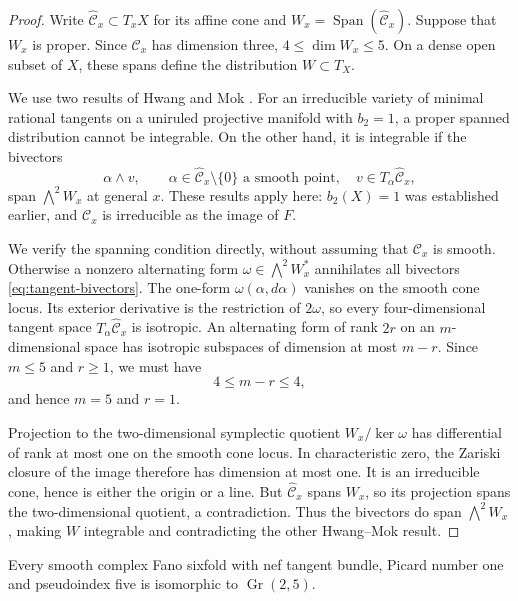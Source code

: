 \begin{proof}
Write $\widehat{\mathcal C}_x\subset T_xX$ for its affine cone and
$W_x=\operatorname{Span}(\widehat{\mathcal C}_x)$.  Suppose that $W_x$
is proper.  Since $\mathcal C_x$ has dimension three,
$4\leq\dim W_x\leq5$.  On a dense open subset of $X$, these spans
define the distribution $W\subset T_X$.

We use two results of Hwang and Mok
\cite[Propositions~1.2.1 and~1.2.2]{HwangMok1999}.  For an irreducible
variety of minimal rational tangents on a uniruled projective manifold
with $b_2=1$, a proper spanned distribution cannot be integrable.  On
the other hand, it is integrable if the bivectors
\begin{equation}\label{eq:tangent-bivectors}
 \alpha\wedge v,\qquad
 \alpha\in\widehat{\mathcal C}_x\setminus\{0\}
 \text{ a smooth point},\quad
 v\in T_\alpha\widehat{\mathcal C}_x,
\end{equation}
span $\bigwedge^2W_x$ at general $x$.  These results apply here:
$b_2(X)=1$ was established earlier, and $\mathcal C_x$ is irreducible
as the image of $F$.

We verify the spanning condition directly, without assuming that
$\mathcal C_x$ is smooth.  Otherwise a nonzero alternating form
$\omega\in\bigwedge^2W_x^*$ annihilates all bivectors
\eqref{eq:tangent-bivectors}.  The one-form $\omega(\alpha,d\alpha)$
vanishes on the smooth cone locus.  Its exterior derivative is the
restriction of $2\omega$, so every four-dimensional tangent space
$T_\alpha\widehat{\mathcal C}_x$ is isotropic.  An alternating form
of rank $2r$ on an $m$-dimensional space has isotropic subspaces of
dimension at most $m-r$.  Since $m\leq5$ and $r\geq1$, we must have
\[
 4\leq m-r\leq4,
\]
and hence $m=5$ and $r=1$.

Projection to the two-dimensional symplectic quotient
$W_x/\ker\omega$ has differential of rank at most one on the smooth
cone locus.  In characteristic zero, the Zariski closure of the image therefore
has dimension at most one.  It is an irreducible cone, hence is either
the origin or a line.  But $\widehat{\mathcal C}_x$ spans $W_x$, so
its projection spans the two-dimensional quotient, a contradiction.
Thus the bivectors do span $\bigwedge^2W_x$, making $W$ integrable
and contradicting the other Hwang--Mok result.
\end{proof}

\begin{proposition}\label{prop:pseudoindex-five-recognition}
Every smooth complex Fano sixfold with nef tangent bundle, Picard number
one and pseudoindex five is isomorphic to $\operatorname{Gr}(2,5)$.
\end{proposition}


